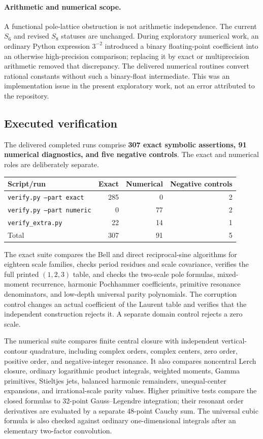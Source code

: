 \paragraph{Arithmetic and numerical scope.}
A functional pole-lattice obstruction is not arithmetic independence.
The current $S_6$ and revised $S_8$ statuses are unchanged. During
exploratory numerical work, an ordinary Python expression $3^{-2}$
introduced a binary floating-point coefficient into an otherwise
high-precision comparison; replacing it by exact or multiprecision
arithmetic removed that discrepancy. The delivered numerical routines
convert rational constants without such a binary-float intermediate.
This was an implementation issue in the present exploratory work, not
an error attributed to the repository.

\subsection{Executed verification}
The delivered completed runs comprise \textbf{307 exact symbolic
assertions, 91 numerical diagnostics, and five negative controls}.
The exact and numerical roles are deliberately separate.
\begin{center}
\begin{tabular}{l r r r}
\toprule
Script/run & Exact & Numerical & Negative controls\\
\midrule
\texttt{verify.py --part exact} & 285 & 0 & 2\\
\texttt{verify.py --part numeric} & 0 & 77 & 2\\
\texttt{verify\_extra.py} & 22 & 14 & 1\\
\midrule
Total & 307 & 91 & 5\\
\bottomrule
\end{tabular}
\end{center}
The exact suite compares the Bell and direct reciprocal-sine algorithms
for eighteen scale families, checks period residues and scale covariance,
verifies the full printed $(1,2,3)$ table, and checks the two-scale pole
formulas, mixed-moment recurrence, harmonic Pochhammer coefficients,
primitive resonance denominators, and low-depth universal parity
polynomials. The corruption control changes an actual coefficient of
the Laurent table and verifies that the independent construction rejects
it. A separate domain control rejects a zero scale.

The numerical suite compares finite central closure with independent
vertical-contour quadrature, including complex orders, complex centers,
zero order, positive order, and negative-integer resonance. It also
compares noncentral Lerch closure, ordinary logarithmic product integrals,
weighted moments, Gamma primitives, Stieltjes jets, balanced harmonic
remainders, unequal-center expansions, and irrational-scale parity
values. Higher primitive tests compare the closed formulas to
32-point Gauss--Legendre integration; their resonant order derivatives
are evaluated by a separate 48-point Cauchy sum. The universal cubic
formula is also checked against ordinary one-dimensional integrals
after an elementary two-factor convolution.


